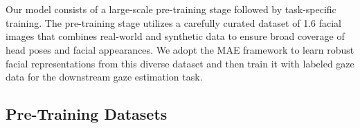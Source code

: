 

\section{\methodname}\label{sec:method}

Our \methodname model consists of a large-scale pre-training stage followed by task-specific training. 
The pre-training stage utilizes a carefully curated dataset of \SI{1.6}{\mega{}} facial images that combines real-world and synthetic data to ensure broad coverage of head poses and facial appearances. 
We adopt the MAE framework to learn robust facial representations from this diverse dataset and then train it with labeled gaze data for the downstream gaze estimation task. 

\subsection{Pre-Training Datasets}\label{sec:pretrain_data_prepare}

\begin{table}[t]
    \begin{center}
    \end{center}
    \caption{
        Statistics of face datasets used to pre-train \methodname in terms of data type to be real or synthetic (Syn.), number of identities, and number of samples.
        The $^{\dagger}$ indicates that we assume there are no duplicated identities during the synthesis image generation.
    }\label{table:face_data_info}
\end{table}



